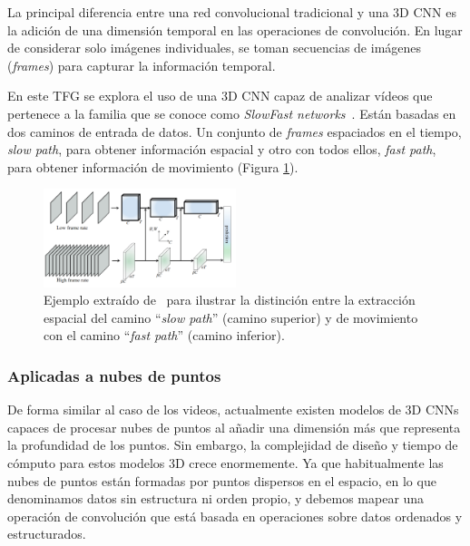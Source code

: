 La principal diferencia entre una red convolucional tradicional y una 3D CNN es 
la adición de una dimensión temporal en las operaciones de convolución. 
En lugar de considerar solo imágenes individuales, se toman secuencias de imágenes 
(\emph{frames}) para capturar la información temporal.

En este TFG se explora el uso de una 3D CNN capaz de analizar vídeos que pertenece 
a la familia que se conoce como \emph{SlowFast networks}~\cite{SlowFastNetworks}. Están basadas en dos caminos 
de entrada de datos. Un conjunto de \emph{frames} espaciados en el tiempo, 
\emph{slow path}, para obtener información espacial y otro con todos ellos, \emph{fast path}, 
para obtener información de movimiento (Figura \ref{fig:SlowFastPathways}). 

\begin{figure}[htp]
  \begin{center}
    \includegraphics[width=0.5\textwidth]{imagenes/chapter2/SlowFastPathways.png}
  \end{center}
  \caption[Red convolucional espaciotemporal \emph{SlowFast}.]{Ejemplo extraído de~\cite{SlowFastNetworks} para ilustrar la distinción 
  entre la extracción espacial del camino ``\emph{slow path}'' (camino superior) y 
  de movimiento con el camino ``\emph{fast path}'' (camino inferior).}
  \label{fig:SlowFastPathways}
\end{figure}

\subsubsection{Aplicadas a nubes de puntos}

De forma similar al caso de los videos, actualmente existen modelos de 3D CNNs 
capaces de procesar nubes de puntos al añadir una dimensión más que representa 
la profundidad de los puntos.  Sin embargo, la complejidad de diseño y tiempo de cómputo para 
estos modelos 3D crece enormemente. Ya que habitualmente las nubes de puntos 
están formadas por puntos dispersos en el espacio, en lo que denominamos datos 
sin estructura ni orden propio, y debemos mapear una operación 
de convolución que está basada en operaciones sobre datos ordenados y estructurados. 


